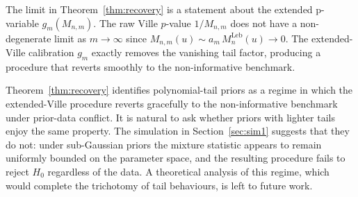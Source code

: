 \documentclass[12pt, a4paper]{report}
\newcommand{\Leb}{\mathrm{Leb}}
\newtheorem{proposition}[theorem]{Proposition}
\newcommand{\1}{\mathbf{1}}
\begin{document}
\begin{remark}
The limit in Theorem~\ref{thm:recovery} is a statement about the
extended p-variable \(g_m(M_{n,m})\). The raw Ville $p$-value
\(1/M_{n,m}\) does not have a non-degenerate limit as $m \to \infty$ since
\(M_{n,m}(u)\sim a_m\,M_n^{\Leb}(u)\to 0\). The extended-Ville
calibration \(g_m\) exactly removes the vanishing tail factor,
producing a procedure that reverts smoothly to the non-informative benchmark.
\end{remark}

Theorem~\ref{thm:recovery} identifies polynomial-tail priors as a regime in which the extended-Ville procedure reverts gracefully to the non-informative benchmark under prior-data conflict. It is natural to ask whether priors with lighter tails enjoy the same property. The simulation in Section~\ref{sec:sim1} suggests that
they do not: under sub-Gaussian priors the mixture statistic appears to remain
uniformly bounded on the parameter space, and the resulting procedure fails to reject \(H_0\) regardless of the data. A theoretical analysis of this regime, which would complete the trichotomy of tail behaviours, is left to future work.



\end{document}
